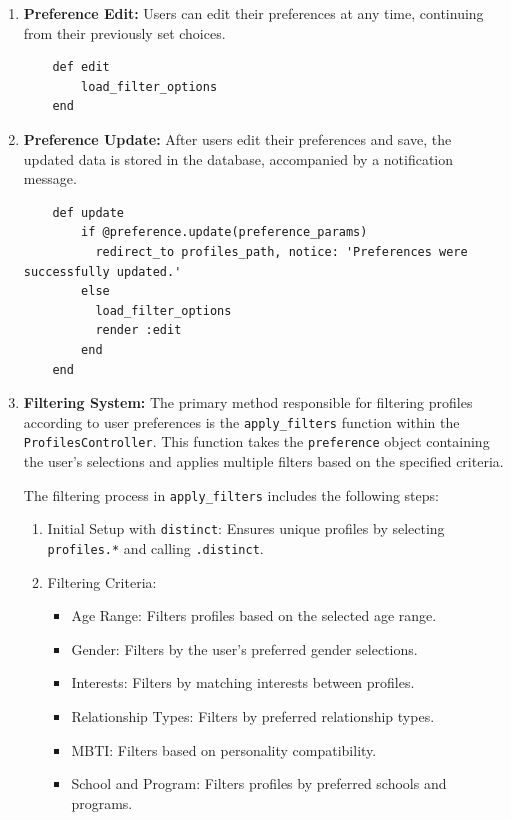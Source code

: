 \begin{enumerate}
    \item \textbf{Preference Edit:} 
    Users can edit their preferences at any time, continuing from their previously set choices. 
    \begin{lstlisting}
    def edit
        load_filter_options
    end
    \end{lstlisting}

    \item \textbf{Preference Update:} 
    After users edit their preferences and save, the updated data is stored in the database, accompanied by a notification message.
    \begin{lstlisting}
    def update
        if @preference.update(preference_params)
          redirect_to profiles_path, notice: 'Preferences were successfully updated.'
        else
          load_filter_options
          render :edit
        end
    end
    \end{lstlisting}

    \newpage
    \item \textbf{Filtering System:} 
    The primary method responsible for filtering profiles according to user preferences is the \texttt{apply\_filters} function within the \texttt{ProfilesController}. This function takes the \texttt{preference} object containing the user’s selections and applies multiple filters based on the specified criteria.

    \bigskip The filtering process in \texttt{apply\_filters} includes the following steps:
    
    \begin{enumerate}
        \item Initial Setup with \texttt{distinct}: Ensures unique profiles by selecting \texttt{profiles.*} and calling \texttt{.distinct}.
        \item Filtering Criteria:
        \begin{itemize}
            \item Age Range: Filters profiles based on the selected age range.
            \item Gender: Filters by the user’s preferred gender selections.
            \item Interests: Filters by matching interests between profiles.
            \item Relationship Types: Filters by preferred relationship types.
            \item MBTI: Filters based on personality compatibility.
            \item School and Program: Filters profiles by preferred schools and programs.
        \end{itemize}
    \end{enumerate}
    

\end{enumerate}
